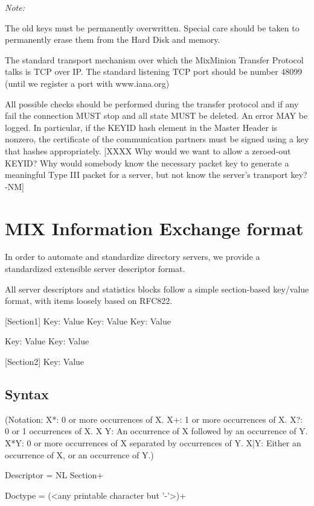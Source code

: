 \emph{Note:}

The old keys must be permanently overwritten. Special care should be
taken to permanently erase them from the Hard Disk and memory. 

The standard transport mechanism over which the MixMinion Transfer
Protocol talks is TCP over IP. The standard listening TCP port should be 
number 48099 (until we register a port with www.iana.org)

All possible checks should be performed during the transfer protocol
and if any fail the connection MUST stop and all state MUST
be deleted. An error MAY be logged. In particular, if the KEYID
hash element in the Master Header is nonzero, the certificate of
the communication partners must be signed using a key that hashes
appropriately.
[XXXX Why would we want to allow a zeroed-out KEYID?  Why would
  somebody know the necessary packet key to generate a meaningful
  Type III packet for a server, but not know the server's transport
  key? -NM]

\section{MIX Information Exchange format}

In order to automate and standardize directory servers, we provide 
a standardized extensible server descriptor format.

All server descriptors and statistics blocks follow a simple
section-based key/value format, with items loosely based on RFC822.

[Section1]
Key: Value
Key: Value
Key: Value

Key: Value
Key: Value

[Section2]
Key: Value

\subsection{Syntax}

(Notation:  X*: 0 or more occurrences of X.
            X+: 1 or more occurrences of X.
	    X?: 0 or 1 occurrences of X.
            X Y: An occurrence of X followed by an occurrence of Y.
	    X*{Y}: 0 or more occurrences of X separated by occurrences
                  of Y.
            X|Y: Either an occurrence of X, or an occurrence of Y.)

Descriptor = NL Section+ 

Doctype = (<any printable character but '-'>)+

